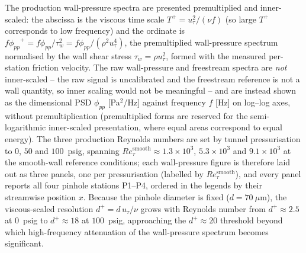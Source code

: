 The production wall-pressure spectra are presented premultiplied and inner-scaled: the abscissa is the viscous time scale $T^+ = u_\tau^2/(\nu f)$ (so large $T^+$ corresponds to low frequency) and the ordinate is ${f\phi_{pp}}^{+} = f\phi_{pp}/\tau_w^2 = f\phi_{pp}/(\rho^2 u_\tau^4)$, the premultiplied wall-pressure spectrum normalised by the wall shear stress $\tau_w = \rho u_\tau^2$, formed with the measured per-station friction velocity. The raw wall-pressure and freestream spectra are \emph{not} inner-scaled -- the raw signal is uncalibrated and the freestream reference is not a wall quantity, so inner scaling would not be meaningful -- and are instead shown as the dimensional PSD $\phi_{pp}$ [Pa$^2$/Hz] against frequency $f$ [Hz] on log--log axes, without premultiplication (premultiplied forms are reserved for the semi-logarithmic inner-scaled presentation, where equal areas correspond to equal energy). The three production Reynolds numbers are set by tunnel pressurisation to $0$, $50$ and $100$~psig, spanning $Re_\tau^{\mathrm{smooth}} \approx 1.3\times10^{3}$, $5.3\times10^{3}$ and $9.1\times10^{3}$ at the smooth-wall reference conditions; each wall-pressure figure is therefore laid out as three panels, one per pressurisation (labelled by $Re_\tau^{\mathrm{smooth}}$), and every panel reports all four pinhole stations P1--P4, ordered in the legends by their streamwise position $x$. Because the pinhole diameter is fixed ($d = 70~\mu\mathrm{m}$), the viscous-scaled resolution $d^{+} = d\,u_\tau/\nu$ grows with Reynolds number from $d^{+}\approx 2.5$ at $0$~psig to $d^{+}\approx 18$ at $100$~psig, approaching the $d^{+}\approx 20$ threshold beyond which high-frequency attenuation of the wall-pressure spectrum becomes significant.

